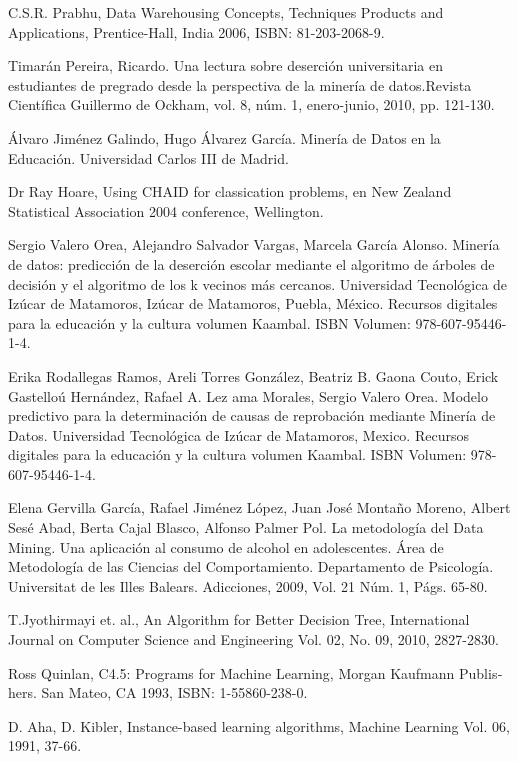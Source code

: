 \begin{thebibliography}{Referencias}
C.S.R. Prabhu, Data Warehousing Concepts, Techniques
Products and Applications, Prentice-Hall, India 2006, ISBN: 81-203-2068-9.

Timarán Pereira, Ricardo. Una lectura sobre deserción
universitaria en estudiantes de pregrado desde la perspectiva de la
minería de datos.Revista Científica Guillermo de Ockham, vol. 8, núm.
1, enero-junio, 2010, pp. 121-130.

Álvaro Jiménez Galindo, Hugo Álvarez García. Minería
de Datos en la Educación. Universidad Carlos III de Madrid.

Dr Ray Hoare, Using CHAID for classication problems,
en New Zealand Statistical Association 2004 conference, Wellington.

Sergio Valero Orea, Alejandro Salvador Vargas, Marcela
García Alonso. Minería de datos: predicción de la deserción escolar
mediante el algoritmo de árboles de decisión y el algoritmo de los
k vecinos más cercanos. Universidad Tecnológica de Izúcar de Matamoros,
Izúcar de Matamoros, Puebla, México. Recursos digitales para la educación
y la cultura volumen Kaambal. ISBN Volumen: 978-607-95446-1-4.

Erika Rodallegas Ramos, Areli Torres González, Beatriz
B. Gaona Couto, Erick Gastelloú Hernández, Rafael A. Lez ama Morales,
Sergio Valero Orea. Modelo predictivo para la determinación de causas
de reprobación mediante Minería de Datos. Universidad Tecnológica
de Izúcar de Matamoros, Mexico. Recursos digitales para la educación
y la cultura volumen Kaambal. ISBN Volumen: 978-607-95446-1-4.

Elena Gervilla García, Rafael Jiménez López, Juan
José Montaño Moreno, Albert Sesé Abad, Berta Cajal Blasco, Alfonso
Palmer Pol. La metodología del Data Mining. Una aplicación al consumo
de alcohol en adolescentes. Área de Metodología de las Ciencias del
Comportamiento. Departamento de Psicología. Universitat de les Illes
Balears. Adicciones, 2009, Vol. 21 Núm. 1, Págs. 65-80.

T.Jyothirmayi et. al., An Algorithm for Better Decision
Tree, International Journal on Computer Science and Engineering Vol.
02, No. 09, 2010, 2827-2830.

\foreignlanguage{spanish}{Ross Quinlan, C4.5: Programs for Machine Learning, Morgan Kaufmann Publishers. San Mateo, CA 1993, ISBN: 1-55860-238-0.}

D. Aha, D. Kibler, Instance-based learning algorithms, Machine Learning Vol.
06, 1991, 37-66.


\end{thebibliography}
